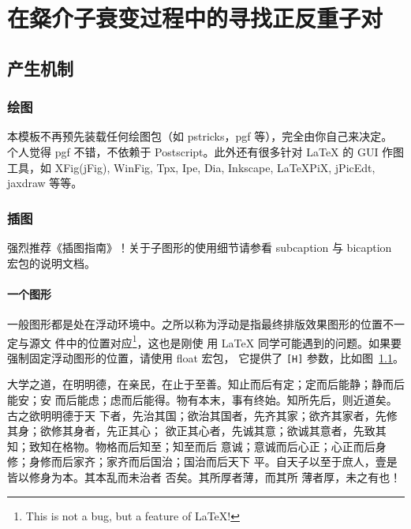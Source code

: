 ﻿

\chapter{在粲介子衰变过程中的寻找正反重子对}
\label{cha:charm}

\section{产生机制}
\label{sec:theory}


\subsection{绘图}
\label{sec:draw}

本模板不再预先装载任何绘图包（如 \textsf{pstricks，pgf} 等），完全由你自己来决定。
个人觉得 \textsf{pgf} 不错，不依赖于 Postscript。此外还有很多针对 \LaTeX{} 的
 GUI 作图工具，如 XFig(jFig), WinFig, Tpx, Ipe, Dia, Inkscape, LaTeXPiX,
jPicEdt, jaxdraw 等等。

\subsection{插图}
\label{sec:graphs}

强烈推荐《\LaTeXe 插图指南》！关于子图形的使用细节请参看 \textsf{subcaption}
与 \textsf{bicaption} 宏包的说明文档。

\subsubsection{一个图形}
\label{sec:onefig}
一般图形都是处在浮动环境中。之所以称为浮动是指最终排版效果图形的位置不一定与源文
件中的位置对应\footnote{This is not a bug, but a feature of \LaTeX!}，这也是刚使
用 \LaTeX{} 同学可能遇到的问题。如果要强制固定浮动图形的位置，请使用 \textsf{float} 宏包，
它提供了 \texttt{[H]} 参数，比如图~\ref{fig:xfig1}。
\begin{figure}[H] %
  \centering
  \label{fig:xfig1}
\end{figure}

大学之道，在明明德，在亲民，在止于至善。知止而后有定；定而后能静；静而后能安；安
而后能虑；虑而后能得。物有本末，事有终始。知所先后，则近道矣。古之欲明明德于天
下者，先治其国；欲治其国者，先齐其家；欲齐其家者，先修其身；欲修其身者，先正其心；
欲正其心者，先诚其意；欲诚其意者，先致其知；致知在格物。物格而后知至；知至而后
意诚；意诚而后心正；心正而后身 修；身修而后家齐；家齐而后国治；国治而后天下
平。自天子以至于庶人，壹是皆以修身为本。其本乱而未治者 否矣。其所厚者薄，而其所
薄者厚，未之有也！

